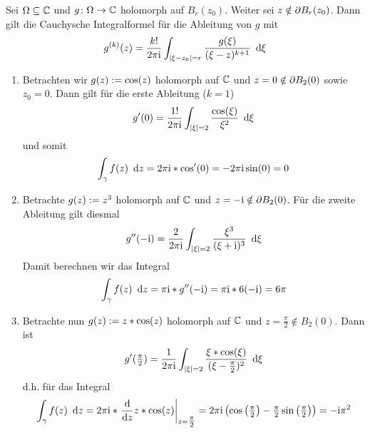 \begin{exercisePage}
	Sei $\Omega \subseteq \mathbb{C}$ und $g \colon \Omega \to \mathbb{C}$ holomorph auf $B_r(z_0)$. Weiter sei $z \notin \partial B_r(z_0)$. Dann gilt die Cauchysche Integralformel für die Ableitung von $g$ mit 
	\begin{equation*}
		g^{(k)}(z) = \frac{k!}{2 \pi \mathrm{i}} \int_{\left| \xi - z_0 \right| = r} \frac{g(\xi)}{(\xi - z)^{k+1}} \enskip \mathrm{d}\xi
	\end{equation*}
	
	\begin{enumerate}[label=(zu \alph*), leftmargin=*]
		\item Betrachten wir $g(z) \mathrel{:=} \cos(z)$ holomorph auf $\mathbb{C}$ und $z = 0 \notin \partial B_2(0)$ sowie $z_0 = 0$. Dann gilt für die erste Ableitung ($k=1$)
		\begin{equation*}
			g'(0) = \frac{1!}{2 \pi \mathrm{i}} \int_{\left| \xi \right| = 2} \frac{\cos(\xi)}{\xi^2} \enskip \mathrm{d}\xi
		\end{equation*}
		und somit
		\begin{equation*}
			\int_\gamma f(z) \enskip \mathrm{d}z = 2 \pi \mathrm{i} * \cos'(0) = - 2 \pi \mathrm{i} \sin(0) = 0
		\end{equation*}
		
		\item Betrachte $g(z) \mathrel{:=} z^3$ holomorph auf $\mathbb{C}$ und $z = - \mathrm{i} \notin \partial B_2(0)$. Für die zweite Ableitung gilt diesmal 
		\begin{equation*}
			g''(-\mathrm{i}) = \frac{2}{2 \pi \mathrm{i}} \int_{\left| \xi \right| = 2} \frac{\xi^3}{(\xi + \mathrm{i})^3} \enskip \mathrm{d}\xi 
		\end{equation*}
		Damit berechnen wir das Integral
		\begin{equation*}
			\int_\gamma f(z) \enskip \mathrm{d}z = \pi \mathrm{i} * g''(-\mathrm{i}) = \pi \mathrm{i} * 6 (-\mathrm{i}) = 6 \pi
		\end{equation*}
		
		\item Betrachte nun $g(z) \mathrel{:=} z * \cos(z)$ holomorph auf $\mathbb{C}$ und $z = \frac \pi 2 \notin B_2(0)$. Dann ist
		\begin{equation*}
			g'(\tfrac{\pi}{2}) = \frac{1}{2 \pi \mathrm{i}} \int_{\left| \xi \right| = 2} \frac{\xi * \cos(\xi)}{(\xi - \tfrac{\pi}{2})^2} \enskip \mathrm{d}\xi
		\end{equation*}
		d.h. für das Integral
		\begin{equation*}
			\int_\gamma f(z) \enskip \mathrm{d}z = 2 \pi \mathrm{i} * \left. \frac{\mathrm{d}}{\mathrm{d} z } z * \cos(z) \right\vert_{z = \tfrac{\pi}{2}} = 2 \pi \mathrm{i} \left( \cos\left( \tfrac{\pi}{2} \right) - \tfrac{\pi}{2} \sin\left( \tfrac{\pi}{2} \right) \right) = -\mathrm{i} \pi^2
		\end{equation*}
		

\end{enumerate}
\end{exercisePage}
